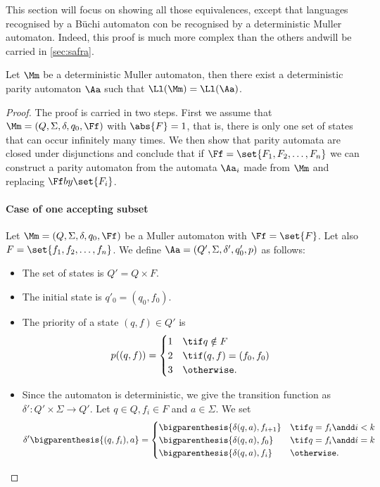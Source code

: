 This section will focus on showing all those equivalences,
except that languages recognised by a Büchi automaton
con be recognised by a deterministic Muller automaton.
Indeed, this proof is much more complex than the others
andwill be carried in \autoref{sec:safra}.

\begin{lemma}
    \label{lem:muller-to-parity}
    Let $\Mm$ be a deterministic Muller automaton,
    then there exist a deterministic parity automaton $\Aa$
    such that $\Ll(\Mm) = \Ll(\Aa)$.
\end{lemma}

\begin{proof}
    The proof is carried in two steps.
    First we assume that $\Mm = (Q, \Sigma, \delta, q_0, \Ff)$
    with $\abs{F} = 1$, that is, there is only one set
    of states that can occur infinitely many times.
    We then show that parity automata are closed under disjunctions
    and conclude that if $\Ff = \set{F_1, F_2, \dots, F_n}$
    we can construct a parity automaton from the automata
    $\Aa_i$ made from $\Mm$ and replacing $\Ff by \set{F_i}$.

    \paragraph*{Case of one accepting subset}
    Let $\Mm = (Q, \Sigma, \delta, q_0, \Ff)$ be a Muller automaton
    with $\Ff = \set{F}$. Let also $F = \set{f_1, f_2, \dots, f_n}$.
    We define $\Aa = (Q', \Sigma, \delta', q'_0, p)$ as follows:
    \begin{itemize}
        \item The set of states is $Q' = Q \times F$.
        \item The initial state is $q'_0 = (q_0, f_0)$.
        \item The priority of a state $(q, f) \in Q'$ is \[
            p((q, f)) = \begin{cases}
                1 & \tif q \notin F \\
                2 & \tif (q, f) = (f_0, f_0) \\
                3 & \otherwise.
            \end{cases}
        \]
        \item Since the automaton is deterministic, we give the transition
            function as $\delta': Q' \times \Sigma \to Q'$. Let $q \in Q, f_i \in F$
            and $a \in \Sigma$. We set \[
            \delta'\bigparenthesis{(q, f_i), a} = \begin{cases}
                \bigparenthesis{\delta(q, a), f_{i+1}} & \tif q = f_i \andd i < k \\
                \bigparenthesis{\delta(q, a), f_0} & \tif q = f_i \andd i = k \\
                \bigparenthesis{\delta(q, a), f_i} & \otherwise.
            \end{cases}
        \]
    \end{itemize}


\end{proof}
